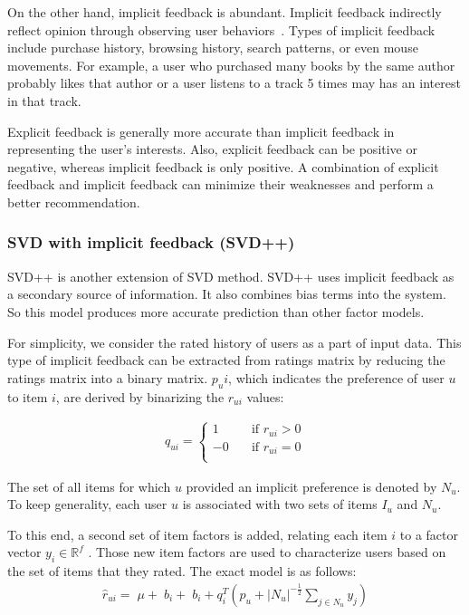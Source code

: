 \documentclass[oneside,13pt]{extreport}
\begin{document}
 On the other hand, implicit feedback is abundant. Implicit feedback indirectly reflect opinion through observing user behaviors~\cite{Oard98}. Types of implicit feedback include purchase history, browsing history, search patterns, or even mouse movements. For
example, a user who purchased many books by the same author probably likes that
author or  a user listens to a track 5 times may has an interest in that track.

Explicit feedback is generally more accurate than implicit feedback in representing the user’s interests. Also, explicit feedback can be positive or negative, whereas implicit feedback is only positive. A combination of explicit feedback and implicit feedback can minimize their weaknesses and perform a better recommendation.

\subsubsection{SVD with implicit feedback (SVD++)}
SVD++ is another extension of SVD method. SVD++ uses implicit feedback as a secondary source of information. It also combines bias terms into the system. So this model produces more accurate prediction than other factor models. 

For simplicity, we consider the rated history of users as a part of input data. This type of implicit feedback can be extracted from ratings matrix by reducing the ratings matrix into a binary matrix. $p_ui$, which indicates the preference of user $u$ to item $i$, are derived by binarizing the $r_{ui}$ values:

\begin{eqnarray}
\label{eq:implicit_binary}
q_{ui} = \begin{cases} 1 & \quad \text{if } r_{ui} > 0\\ -0 & \quad \text{if } r_{ui} = 0\\ \end{cases}
\end{eqnarray}

The set of all items for which $u$ provided an implicit preference is denoted by $N_u$. To keep generality, each user $u$ is associated with two sets of items $I_u$ and $N_u$.

To this end, a second set of item factors is added, relating each item $i$ to a factor
vector ${y_i} \in {\mathbb{R}^f}$ . Those new item factors are used to characterize users based on the
set of items that they rated. The exact model is as follows:
\begin{eqnarray}
\label{eq:svd++_pre}
{\hat r_{ui}} = \;\mu  + \;{b_i} + \;{b_i} + q_i^T\left( {{p_u} + {{\left| {{N_u}} \right|}^{ - \frac{1}{2}}}\sum\limits_{j \in  {N_u}} {{y_j}} } \right)
\end{eqnarray}
\end{document}
